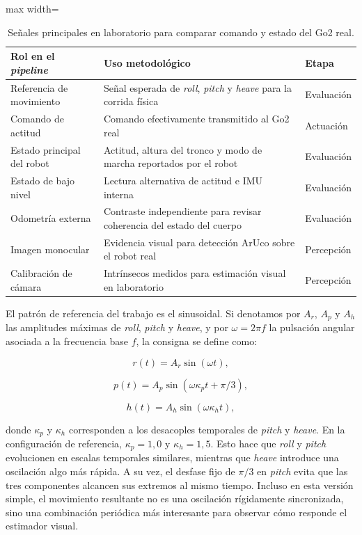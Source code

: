 \documentclass[12pt,a4paper]{report}
\begin{document}
\begin{table}[H]
\centering
\footnotesize
\caption{Señales principales en laboratorio para comparar comando y estado del
Go2 real.}
\label{tab:ros_interfaces_lab}
\begin{adjustbox}{max width=\textwidth}
\begin{tabular}{p{}p{}p{}}
\toprule
Rol en el \textit{pipeline} & Uso metodológico & Etapa \\
\midrule
Referencia de movimiento & Señal esperada de \emph{roll}, \emph{pitch} y \emph{heave} para la corrida física & Evaluación \\
Comando de actitud & Comando efectivamente transmitido al Go2 real & Actuación \\
Estado principal del robot & Actitud, altura del tronco y modo de marcha reportados por el robot & Evaluación \\
Estado de bajo nivel & Lectura alternativa de actitud e IMU interna & Evaluación \\
Odometría externa & Contraste independiente para revisar coherencia del estado del cuerpo & Evaluación \\
Imagen monocular & Evidencia visual para detección ArUco sobre el robot real & Percepción \\
Calibración de cámara & Intrínsecos medidos para estimación visual en laboratorio & Percepción \\
\bottomrule
\end{tabular}
\end{adjustbox}
\end{table}

El patrón de referencia del trabajo es el sinusoidal. Si denotamos por \(A_r\),
\(A_p\) y \(A_h\) las amplitudes máximas de \emph{roll}, \emph{pitch} y \emph{heave}, y por
\(\omega = 2 \pi f\) la pulsación angular asociada a la frecuencia base
\(f\), la consigna se define como:

\begin{equation}
r(t) = A_r \sin(\omega t),
\end{equation}

\begin{equation}
p(t) = A_p \sin(\omega \kappa_p t + \pi/3),
\end{equation}

\begin{equation}
h(t) = A_h \sin(\omega \kappa_h t),
\end{equation}

donde \(\kappa_p\) y \(\kappa_h\) corresponden a los desacoples temporales de
\emph{pitch} y \emph{heave}. En la configuración de referencia, \(\kappa_p = 1{,}0\) y
\(\kappa_h = 1{,}5\). Esto
hace que \emph{roll} y \emph{pitch} evolucionen en escalas temporales similares, mientras que
\emph{heave} introduce una oscilación algo más rápida. A su vez, el desfase fijo de
\(\pi/3\) en \emph{pitch} evita que las tres componentes alcancen sus extremos al
mismo tiempo. Incluso en esta versión simple, el movimiento resultante no es
una oscilación rígidamente sincronizada, sino una combinación periódica más
interesante para observar cómo responde el estimador visual.
\end{document}
